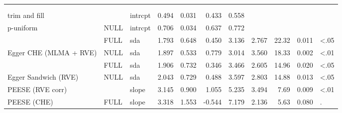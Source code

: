 \documentclass[
]{book}
\begin{document}
\begin{tabular}{l|l|l|r|r|r|r|r|r|r|l}
\cline{1-11}
\cellcolor[HTML]{ABEBC6}{\textcolor{gray}{PEESE (RVE corr)}} & \cellcolor[HTML]{ABEBC6}{\textcolor{gray}{NULL}} & \cellcolor[HTML]{ABEBC6}{\textcolor{gray}{intrcpt}} & \cellcolor[HTML]{ABEBC6}{\textcolor{gray}{0.220}} & \cellcolor[HTML]{ABEBC6}{\textcolor{gray}{0.128}} & \cellcolor[HTML]{ABEBC6}{\textcolor{gray}{-0.057}} & \cellcolor[HTML]{ABEBC6}{\textcolor{gray}{0.496}} & \cellcolor[HTML]{ABEBC6}{\textcolor{gray}{1.719}} & \cellcolor[HTML]{ABEBC6}{\textcolor{gray}{12.71}} & \cellcolor[HTML]{ABEBC6}{\textcolor{gray}{0.110}} & \cellcolor[HTML]{ABEBC6}{\textcolor{gray}{}}\\
\cline{1-11}
\textcolor{black}{\em{\textbf{\cellcolor[HTML]{ABEBC6}{PEESE (RVE corr)}}}} & \textcolor{black}{\em{\textbf{\cellcolor[HTML]{ABEBC6}{FULL}}}} & \textcolor{black}{\em{\textbf{\cellcolor[HTML]{ABEBC6}{intrcpt}}}} & \textcolor{black}{\em{\textbf{\cellcolor[HTML]{ABEBC6}{0.367}}}} & \textcolor{black}{\em{\textbf{\cellcolor[HTML]{ABEBC6}{0.148}}}} & \textcolor{black}{\em{\textbf{\cellcolor[HTML]{ABEBC6}{0.056}}}} & \textcolor{black}{\em{\textbf{\cellcolor[HTML]{ABEBC6}{0.677}}}} & \textcolor{black}{\em{\textbf{\cellcolor[HTML]{ABEBC6}{2.478}}}} & \textcolor{black}{\em{\textbf{\cellcolor[HTML]{ABEBC6}{18.24}}}} & \textcolor{black}{\em{\textbf{\cellcolor[HTML]{ABEBC6}{0.023}}}} & \textcolor{black}{\em{\textbf{\cellcolor[HTML]{ABEBC6}{<.05}}}}\\
\cline{1-11}
trim and fill &  & intrcpt & 0.494 & 0.031 & 0.433 & 0.558 &  &  &  & \\
\cline{1-1}
\cline{3-11}
p-uniform & \multirow[t]{-2}{*}{\raggedright\arraybackslash NULL} & intrcpt & 0.706 & 0.034 & 0.637 & 0.772 &  &  &  & \\
\cline{1-11}
 & FULL & sda & 1.793 & 0.648 & 0.450 & 3.136 & 2.767 & 22.32 & 0.011 & <.05\\
\cline{2-11}
\multirow[t]{-2}{*}{\raggedright\arraybackslash Egger CHE (MLMA + RVE)} & NULL & sda & 1.897 & 0.533 & 0.779 & 3.014 & 3.560 & 18.33 & 0.002 & <.01\\
\cline{1-11}
 & FULL & sda & 1.906 & 0.732 & 0.346 & 3.466 & 2.605 & 14.96 & 0.020 & <.05\\
\cline{2-11}
\multirow[t]{-2}{*}{\raggedright\arraybackslash Egger Sandwich (RVE)} & NULL & sda & 2.043 & 0.729 & 0.488 & 3.597 & 2.803 & 14.88 & 0.013 & <.05\\
\cline{1-11}
PEESE (RVE corr) &  & slope & 3.145 & 0.900 & 1.055 & 5.235 & 3.494 & 7.69 & 0.009 & <.01\\
\cline{1-1}
\cline{3-11}
PEESE (CHE) & \multirow[t]{-2}{*}{\raggedright\arraybackslash FULL} & slope & 3.318 & 1.553 & -0.544 & 7.179 & 2.136 & 5.63 & 0.080 & .\\

\end{tabular}
\end{document}
